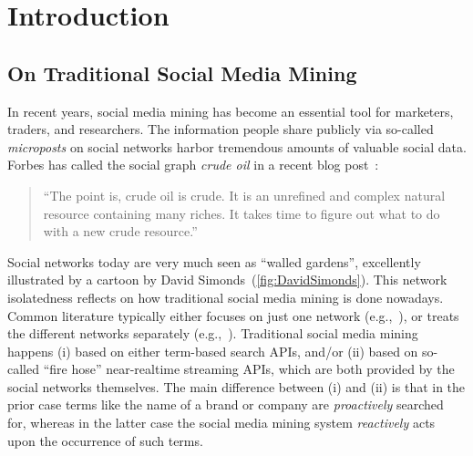 \documentclass{iosart2c}
\begin{document}

\section{Introduction} \label{sec:introduction}
\subsection{On Traditional Social Media Mining}
In recent years, social media mining has become an essential tool for marketers, traders, and researchers.
The information people share publicly via so-called \emph{microposts} on social networks harbor tremendous amounts of valuable social data.
Forbes has called the social graph \emph{crude oil} in a recent blog post~\cite{ForbesPost}:
\begin{quotation}
\hspace{-.9em}
``The point is, crude oil is crude. It is an unrefined and complex natural resource containing many riches. It takes time to figure out what to do with a new crude resource.''
\end{quotation}
Social networks today are very much seen as ``walled gardens'', excellently illustrated by a cartoon by David Simonds~(\autoref{fig:DavidSimonds}).
This network isolatedness reflects on how traditional social media mining is done nowadays.
Common literature typically either focuses on just one network (e.g.,~\cite{russell201121}), or treats the different networks separately (e.g.,~\cite{russell2011mining}).
Traditional social media mining happens (i) based on either term-based search APIs, and/or (ii) based on so-called ``fire hose'' near-realtime streaming APIs, which are both provided by the social networks themselves.
The main difference between (i) and (ii) is that in the prior case terms like the name of a brand or company are \emph{proactively} searched for, whereas in the latter case the social media mining system \emph{reactively} acts upon the occurrence of such terms.
\end{document}
